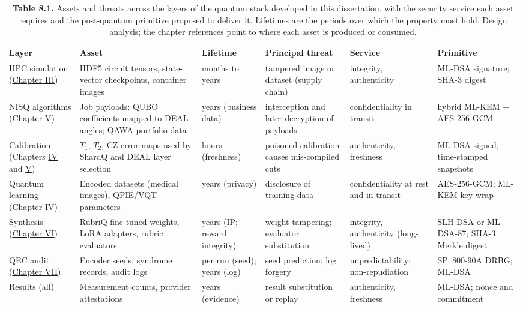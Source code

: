 \documentclass{report}
\theoremstyle{plain}
\theoremstyle{definition}
\theoremstyle{remark}
\begin{document}
\begin{table}[htbp]
\caption{\textbf{Table 8.1.} Assets and threats across the layers of the quantum stack developed in this dissertation, with the security service each asset requires and the post-quantum primitive proposed to deliver it. Lifetimes are the periods over which the property must hold. Design analysis; the chapter references point to where each asset is produced or consumed.}
\label{tab:pqc:assets}
 
  \footnotesize


\begin{tabular}{llllll}
\toprule
Layer & Asset & Lifetime & Principal threat & Service & Primitive \\
\midrule
HPC simulation (\hyperref[ch:qgear]{Chapter III}) & HDF5 circuit tensors, state-vector checkpoints, container images & months to years & tampered image or dataset (supply chain) & integrity, authenticity & ML-DSA signature; SHA-3 digest \\
NISQ algorithms (\hyperref[ch:nisq]{Chapter V}) & Job payloads: QUBO coefficients mapped to DEAL angles; QAWA portfolio data & years (business data) & interception and later decryption of payloads & confidentiality in transit & hybrid ML-KEM + AES-256-GCM \\
Calibration (Chapters \hyperref[ch:qml]{IV} and \hyperref[ch:nisq]{V}) & $T_1$, $T_2$, CZ-error maps used by ShardQ and DEAL layer selection & hours (freshness) & poisoned calibration causes mis-compiled cuts & authenticity, freshness & ML-DSA-signed, time-stamped snapshots \\
Quantum learning (\hyperref[ch:qml]{Chapter IV}) & Encoded datasets (medical images), QPIE/VQT parameters & years (privacy) & disclosure of training data & confidentiality at rest and in transit & AES-256-GCM; ML-KEM key wrap \\
Synthesis (\hyperref[ch:synthesis]{Chapter VI}) & RubriQ fine-tuned weights, LoRA adapters, rubric evaluators & years (IP; reward integrity) & weight tampering; evaluator substitution & integrity, authenticity (long-lived) & SLH-DSA or ML-DSA-87; SHA-3 Merkle digest \\
QEC audit (\hyperref[ch:qec]{Chapter VII}) & Encoder seeds, syndrome records, audit logs & per run (seed); years (log) & seed prediction; log forgery & unpredict\-ability; non-repudiation & SP~800-90A DRBG; ML-DSA \\
Results (all) & Measurement counts, provider attestations & years (evidence) & result substitution or replay & authenticity, freshness & ML-DSA; nonce and commitment \\
\bottomrule
\end{tabular}
 
\end{table}
\end{document}
